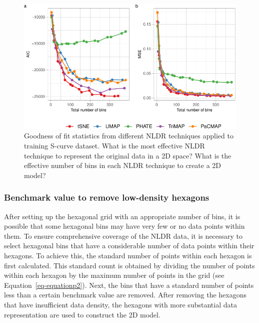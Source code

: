 \documentclass[
  12pt]{article}
\begin{document}
\begin{figure}

{\centering \includegraphics{paper_files/figure-pdf/fig-diagnosticpltScurve-1.pdf}

}

\caption{\label{fig-diagnosticpltScurve}Goodness of fit statistics from
different NLDR techniques applied to training S-curve dataset. What is
the most effective NLDR technique to represent the original data in a 2D
space? What is the effective number of bins in each NLDR technique to
create a 2D model?}

\end{figure}

\hypertarget{benchmark-value-to-remove-low-density-hexagons}{%
\subsubsection{Benchmark value to remove low-density
hexagons}\label{benchmark-value-to-remove-low-density-hexagons}}

After setting up the hexagonal grid with an appropriate number of bins,
it is possible that some hexagonal bins may have very few or no data
points within them. To ensure comprehensive coverage of the NLDR data,
it is necessary to select hexagonal bins that have a considerable number
of data points within their hexagons. To achieve this, the standard
number of points within each hexagon is first calculated. This standard
count is obtained by dividing the number of points within each hexagon
by the maximum number of points in the grid (see
Equation~\ref{eq-equationp2}). Next, the bins that have a standard
number of points less than a certain benchmark value are removed. After
removing the hexagons that have insufficient data density, the hexagons
with more substantial data representation are used to construct the 2D
model.
\end{document}
